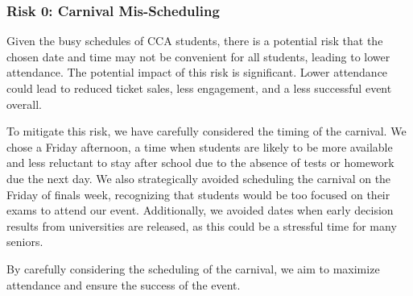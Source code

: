 \subsubsection{Risk 0: Carnival Mis-Scheduling}

Given the busy schedules of CCA students, there is a potential risk that the chosen date and time may not be convenient for all students, leading to lower attendance. The potential impact of this risk is significant. Lower attendance could lead to reduced ticket sales, less engagement, and a less successful event overall.

To mitigate this risk, we have carefully considered the timing of the carnival. We chose a Friday afternoon, a time when students are likely to be more available and less reluctant to stay after school due to the absence of tests or homework due the next day. We also strategically avoided scheduling the carnival on the Friday of finals week, recognizing that students would be too focused on their exams to attend our event. Additionally, we avoided dates when early decision results from universities are released, as this could be a stressful time for many seniors.

By carefully considering the scheduling of the carnival, we aim to maximize attendance and ensure the success of the event.
